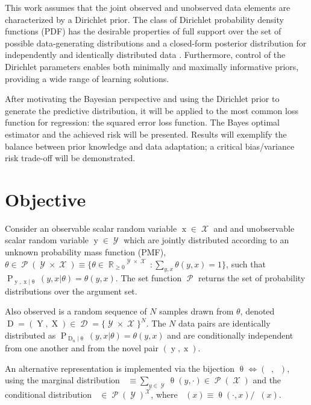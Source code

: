 \documentclass{article}
\DeclareMathOperator{\xrm}{\mathrm{x}}
\DeclareMathOperator{\Xrm}{\mathrm{X}}
\DeclareMathOperator{\yrm}{\mathrm{y}}
\DeclareMathOperator{\Yrm}{\mathrm{Y}}
\DeclareMathOperator{\Drm}{\mathrm{D}}
\DeclareMathOperator{\Prm}{\mathrm{P}}
\DeclareMathOperator{\Xcal}{\mathcal{X}}
\DeclareMathOperator{\Ycal}{\mathcal{Y}}
\DeclareMathOperator{\Dcal}{\mathcal{D}}
\DeclareMathOperator{\Pcal}{\mathcal{P}}
\DeclareMathOperator{\Rbb}{\mathbb{R}}
\DeclareMathOperator{\upthetam}{\uptheta_\text{m}}
\DeclareMathOperator{\upthetac}{\uptheta_\text{c}}
\begin{document}
This work assumes that the joint observed and unobserved data elements are characterized by a Dirichlet prior. The class of Dirichlet probability density functions (PDF) has the desirable properties of full support over the set of possible data-generating distributions and a closed-form posterior distribution for independently and identically distributed data \cite{ferguson}. Furthermore, control of the Dirichlet parameters enables both minimally and maximally informative priors, providing a wide range of learning solutions.

After motivating the Bayesian perspective and using the Dirichlet prior to generate the predictive distribution, it will be applied to the most common loss function for regression: the squared error loss function. The Bayes optimal estimator and the achieved risk will be presented. Results will exemplify the balance between prior knowledge and data adaptation; a critical bias/variance risk trade-off will be demonstrated.





\section{Objective}

Consider an observable scalar random variable $\xrm \in \Xcal$ and and unobservable scalar random variable $\yrm \in \Ycal$ which are jointly distributed according to an unknown probability mass function (PMF), $\theta \in \Pcal(\Ycal \times \Xcal) \equiv \Big\{ \theta \in {\Rbb_{\geq 0}}^{\Ycal \times \Xcal}: \sum_{y,x} \theta(y,x) = 1 \Bigg\}$, such that $\Prm_{\yrm,\xrm | \uptheta}(y,x | \theta) = \theta(y,x)$. The set function $\Pcal$ returns the set of probability distributions over the argument set.

Also observed is a random sequence of $N$ samples drawn from $\theta$, denoted $\Drm = ( \Yrm,\Xrm ) \in \Dcal = \{\Ycal \times \Xcal\}^N$. The $N$ data pairs are identically distributed as $\Prm_{\Drm_n | \uptheta}(y,x | \theta) = \theta(y,x)$ and are conditionally independent from one another and from the novel pair $(\yrm,\xrm)$.


An alternative representation is implemented via the bijection $\uptheta \Leftrightarrow (\upthetam,\upthetac)$, using the marginal distribution $\upthetam \equiv \sum_{y \in \Ycal} \uptheta(y,\cdot) \in \Pcal(\Xcal)$ and the conditional distribution $\upthetac \in \Pcal(\Ycal)^{\Xcal}$, where $\upthetac(x) \equiv \uptheta(\cdot,x) / \upthetam(x)$. 
\end{document}
